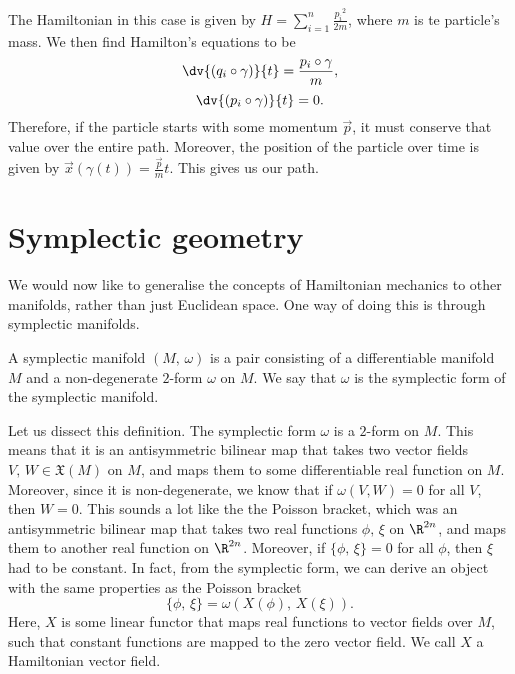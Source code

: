 \documentclass{article}
\begin{document}
\begin{multicols}{2}
	The Hamiltonian in this case is given by \(H = \sum_{i=1}^n\frac{{p_i}^2}{2m}\), where \(m\) is te particle's mass. We then find Hamilton's equations to be
	\begin{equation}
		\dv{(q_i\circ\gamma)}{t} = \frac{p_i\circ\gamma}{m},
	\end{equation}
	\begin{equation}
		\dv{(p_i\circ\gamma)}{t} = 0.
	\end{equation}
	Therefore, if the particle starts with some momentum \(\vec{p}\), it must conserve that value over the entire path.
	Moreover, the position of the particle over time is given by \(\vec{x}(\gamma(t)) = \frac{\vec{p}}{m}t\). This gives us our path.
	\section{Symplectic geometry}
	We would now like to generalise the concepts of Hamiltonian mechanics to other manifolds, rather than just Euclidean space. One way of doing this is through symplectic manifolds.
	\begin{definition}
		A symplectic manifold \((M,\,\omega)\) is a pair consisting of a differentiable manifold \(M\) and a non-degenerate \(2\)-form \(\omega\) on \(M\). We say that \(\omega\) is the symplectic form of the symplectic manifold.
	\end{definition}
	Let us dissect this definition. The symplectic form \(\omega\) is a \(2\)-form on \(M\). This means that it is an antisymmetric bilinear map that takes two vector fields \(V,\,W\in\mathfrak{X}(M)\) on \(M\), and maps them to some differentiable real function on \(M\). Moreover, since it is non-degenerate, we know that if \(\omega(V,W) = 0\) for all \(V\), then \(W=0\).
	This sounds a lot like the the Poisson bracket, which was an antisymmetric bilinear map that takes two real functions \(\phi,\,\xi\) on \(\R^{2n}\), and maps them to another real function on \(\R^{2n}\). Moreover, if \(\{\phi,\,\xi\}=0\) for all \(\phi\), then \(\xi\) had to be constant.
	In fact, from the symplectic form, we can derive an object with the same properties as the Poisson bracket
	\begin{equation}
		\{\phi,\,\xi\} = \omega(X(\phi),\,X(\xi)).
	\end{equation}
	Here, \(X\) is some linear functor that maps real functions to vector fields over \(M\), such that constant functions are mapped to the zero vector field. We call \(X\) a Hamiltonian vector field.\\

\end{multicols}
\end{document}
